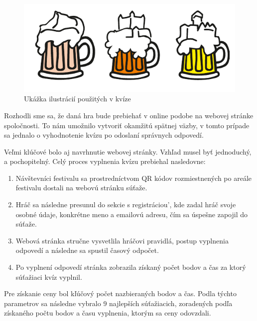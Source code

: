 \documentclass[10pt,twoside,slovak,a4paper]{article}
\begin{document}
\begin{figure}[h]
	\centering
	\includegraphics[scale=1.0]{obrazok1.pdf}

\caption{Ukážka ilustrácií použitých v kvíze}

\end{figure}


Rozhodli sme sa, že daná hra bude prebiehať v online podobe na webovej stránke spoločnosti. To nám umožnilo vytvoriť okamžitú spätnej väzby, v tomto prípade sa jednalo o vyhodnotenie kvízu po odoslaní správnych odpovedí. 

Veľmi klúčové bolo aj navrhnutie webovej stránky. Vzhľad musel byť jednoduchý, a pochopitelný. Celý proces vyplnenia kvízu prebiehal nasledovne:




\begin{enumerate}
	\item Návštevníci festivalu sa prostredníctvom QR kódov rozmiestnených po areále festivalu dostali na webovú stránku súťaže.
	\item Hráč sa následne presunul do sekcie s registráciou', kde zadal hráč svoje osobné údaje, konkrétne meno a emailovú adresu, čím sa úspešne zapojil do súťaže.
	\item Webová stránka stručne vysvetlila hráčovi pravidlá, postup vyplnenia odpovedí a následne sa spustil časový odpočet.
	\item Po vyplnení odpovedí stránka zobrazila získaný počet bodov a čas za ktorý súťažiaci kvíz vyplnil.
\end{enumerate}




Pre získanie ceny bol kľúčový počet nazbieraných bodov a čas. Podla týchto parametrov sa následne vybralo 9 najlepších súťažiacich, zoradených podľa získaného počtu bodov a času vyplnenia, ktorým sa ceny odovzdali.
\end{document}
